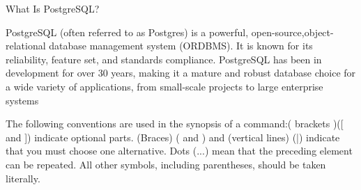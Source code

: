 What Is PostgreSQL? 

PostgreSQL (often referred to as Postgres) is a powerful, open-source,object-relational database management system (ORDBMS). 
It is known for its reliability, feature set, and standards compliance. 
PostgreSQL has been in development for over 30 years, making it a mature and robust database choice for a wide variety of applications,
from small-scale projects to large enterprise systems


The following conventions are used in the synopsis of a command:( brackets )([ and ]) indicate optional parts.
(Braces) ({ and }) and (vertical lines) (|) indicate that you must choose one alternative. 
Dots (...) mean that the preceding element can be repeated. All other symbols, including parentheses, should be taken literally.